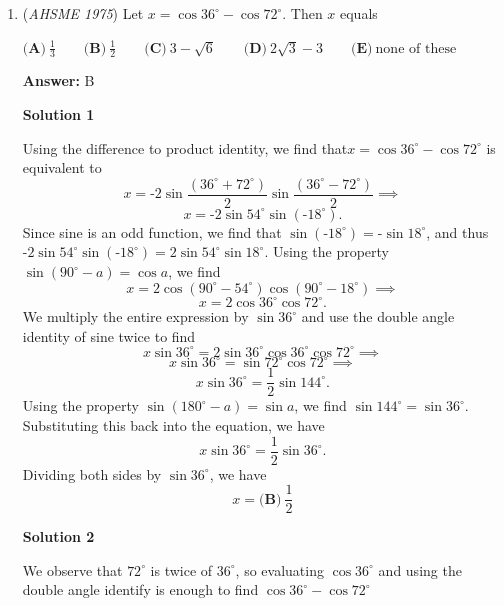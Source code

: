 \begin{enumerate}
 



\textbf{Solution 2 (Binomial Theorem)}

Let's evaluate $(\sqrt{3}+\sqrt{2})^6 + (\sqrt{3}-\sqrt{2})^6$. We see that all the irrational terms cancel. Then, using binomial theorem, we evaluate all the rational terms in the first expression to get 485. Then, the sum of the rational parts of the 2nd term will be 485 as well. Then, we get a total of 970 and since $(\sqrt{3}-\sqrt{2})^6) < 1$, the greatest integer greater than our original expression is $\boxed {\textbf{(C) } 970}$.

 


	\item (\textit{AHSME 1975}) Let $x=\cos 36^{\circ} - \cos 72^{\circ}$. Then $x$ equals


 $\textbf{(A)}\ \frac{1}{3}\qquad \textbf{(B)}\ \frac{1}{2} \qquad \textbf{(C)}\ 3-\sqrt{6} \qquad \textbf{(D)}\ 2\sqrt{3}-3\qquad \textbf{(E)}\ \text{none of these}$

 \textbf{Answer: }B



\textbf{Solution 1}

Using the difference to product identity, we find that$x=\cos 36^{\circ} - \cos 72^{\circ}$ is equivalent to 
 \[x=\text{-}2\sin{\frac{(36^{\circ}+72^{\circ})}{2}}\sin{\frac{(36^{\circ}-72^{\circ})}{2}} \implies\]
 \[x=\text{-}2\sin54^{\circ}\sin(\text{-}18^{\circ}).\] Since sine is an odd function, we find that $\sin{(\text{-}18^{\circ})}= \text{-} \sin{18^{\circ}}$, and thus $\text{-}2\sin54^{\circ}\sin(\text{-}18^{\circ})=2\sin54^{\circ}\sin18^{\circ}$. Using the property $\sin{(90^{\circ}-a)}=\cos{a}$, we find
 \[x=2\cos(90^{\circ}-54^{\circ})\cos(90^{\circ}-18^{\circ}) \implies\]
 \[x=2\cos36^{\circ}\cos72^{\circ}.\]We multiply the entire expression by $\sin36^{\circ}$ and use the double angle identity of sine twice to find
 \[x\sin36^{\circ}=2\sin36^{\circ}\cos36^{\circ}\cos72^{\circ} \implies\]
 \[x\sin36^{\circ}=\sin72^{\circ}\cos72^{\circ} \implies\]
 \[x\sin36^{\circ}=\frac{1}{2}\sin144^{\circ}.\]Using the property $\sin(180^{\circ}-a)=\sin{a}$, we find $\sin144^{\circ}=\sin36^{\circ}.$ Substituting this back into the equation, we have
 \[x\sin36^{\circ}=\frac{1}{2}\sin36^{\circ}.\]Dividing both sides by $\sin36^{\circ}$, we have
 \[x=\boxed{\textbf{(B)}\ \frac{1}{2}}\]




\textbf{Solution 2}

We observe that $72^{\circ}$ is twice of $36^{\circ}$, so evaluating $\cos 36^{\circ}$ and using the double angle identify is enough to find $\cos 36^{\circ} - \cos 72^{\circ}$ 


\end{enumerate}
